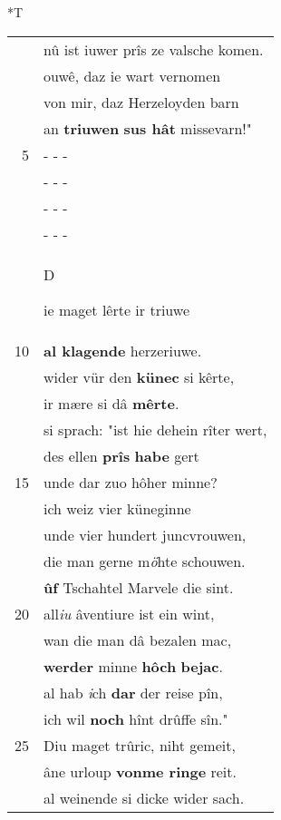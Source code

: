 \documentclass[8pt,a4paper,notitlepage]{article}
\begin{document}
\begin{table}[ht]
\begin{minipage}[t]{0.5\linewidth}
\end{minipage}
\hspace{0.5cm}
\begin{minipage}[t]{0.5\linewidth}
\small
\begin{center}*T
\end{center}
\begin{tabular}{rl}
 & nû ist iuwer prîs ze valsche komen.\\ 
 & ouwê, daz ie wart vernomen\\ 
 & von mir, daz Herzeloyden barn\\ 
 & an \textbf{triuwen} \textbf{sus hât} missevarn!"\\ 
5 & \multicolumn{1}{l}{ - - - }\\ 
 & \multicolumn{1}{l}{ - - - }\\ 
 & \multicolumn{1}{l}{ - - - }\\ 
 & \multicolumn{1}{l}{ - - - }\\ 
 & \begin{large}D\end{large}ie maget lêrte ir triuwe\\ 
10 & \textbf{al klagende} herzeriuwe.\\ 
 & wider vür den \textbf{künec} si kêrte,\\ 
 & ir mære si dâ \textbf{mêrte}.\\ 
 & si sprach: "ist hie dehein rîter wert,\\ 
 & des ellen \textbf{prîs} \textbf{habe} gert\\ 
15 & unde dar zuo hôher minne?\\ 
 & ich weiz vier küneginne\\ 
 & unde vier hundert juncvrouwen,\\ 
 & die man gerne m\textit{ö}hte schouwen.\\ 
 & \textbf{ûf} Tschahtel Marvele die sint.\\ 
20 & all\textit{iu} âventiure ist ein wint,\\ 
 & wan die man dâ bezalen mac,\\ 
 & \textbf{werder} minne \textbf{hôch} \textbf{bejac}.\\ 
 & al hab \textit{i}ch \textbf{dar} der reise pîn,\\ 
 & ich wil \textbf{noch} hînt drûffe sîn."\\ 
25 & Diu maget trûric, niht gemeit,\\ 
 & âne urloup \textbf{vonme ringe} reit.\\ 
 & al weinende si dicke wider sach.\\ 

\end{tabular}
\end{minipage}
\end{table}
\end{document}
